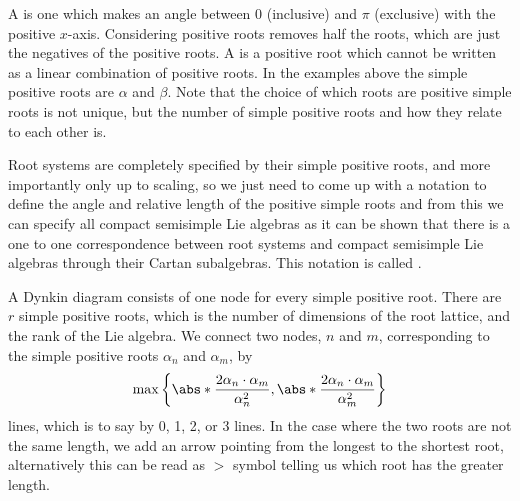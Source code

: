 \documentclass[fleqn]{NotesClass}
\begin{document}
    A  is one which makes an angle between \(0\) (inclusive) and \(\pi\) (exclusive) with the positive \(x\)-axis.
    Considering positive roots removes half the roots, which are just the negatives of the positive roots.
    A  is a positive root which cannot be written as a linear combination of positive roots.
    In the examples above the simple positive roots are \(\alpha\) and \(\beta\).
    Note that the choice of which roots are positive simple roots is not unique, but the number of simple positive roots and how they relate to each other is.
    
    Root systems are completely specified by their simple positive roots, and more importantly only up to scaling, so we just need to come up with a notation to define the angle and relative length of the positive simple roots and from this we can specify all compact semisimple Lie algebras as it can be shown that there is a one to one correspondence between root systems and compact semisimple Lie algebras through their Cartan subalgebras.
    This notation is called .
    
    A Dynkin diagram consists of one node for every simple positive root.
    There are \(r\) simple positive roots, which is the number of dimensions of the root lattice, and the rank of the Lie algebra.
    We connect two nodes, \(n\) and \(m\), corresponding to the simple positive roots \(\alpha_n\) and \(\alpha_m\), by
    \begin{equation}
        \max\left\{ \abs*{\frac{2\alpha_n \cdot \alpha_m}{\alpha_n^2}}, \abs*{\frac{2\alpha_n \cdot \alpha_m}{\alpha_m^2}} \right\}
    \end{equation}
    lines, which is to say by 0, 1, 2, or 3 lines.
    In the case where the two roots are not the same length, we add an arrow pointing from the longest to the shortest root, alternatively this can be read as \(>\) symbol telling us which root has the greater length.
    
\end{document}

